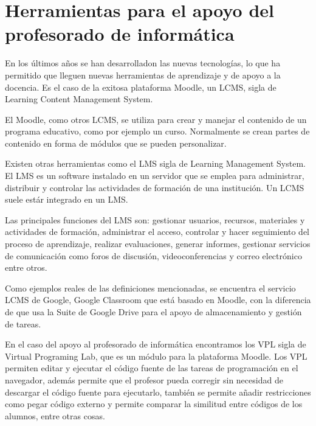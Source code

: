 
\section{Herramientas para el apoyo del profesorado de informática}
\label{1:sec:1}

En los últimos años se han desarrolladon las nuevas tecnologías, lo que ha permitido que lleguen nuevas herramientas de aprendizaje y de apoyo a la docencia. Es el caso de la exitosa plataforma Moodle, un LCMS, sigla de Learning Content Management System. 

El Moodle, como otros LCMS, se utiliza para crear y manejar el contenido de un programa educativo, como por ejemplo un curso. Normalmente se crean partes de contenido en forma de módulos que se pueden personalizar.

Existen otras herramientas como el LMS sigla de Learning Management System. El LMS es un software instalado en un servidor que se emplea para administrar, distribuir y controlar las actividades de formación de una institución. Un LCMS suele estár integrado en un LMS.

Las principales funciones del LMS son: gestionar usuarios, recursos, materiales y actividades de formación, administrar el acceso, controlar y hacer seguimiento del proceso de aprendizaje, realizar evaluaciones, generar informes, gestionar servicios de comunicación como foros de discusión, videoconferencias y correo electrónico entre otros.

Como ejemplos reales de las definiciones mencionadas, se encuentra el servicio LCMS de Google, Google Classroom que está basado en Moodle, con la diferencia de que usa la Suite de Google Drive para el apoyo de almacenamiento y gestión de tareas.

En el caso del apoyo al profesorado de informática encontramos los VPL sigla de Virtual Programing Lab, \cite{B14} que es un módulo para la plataforma Moodle. Los VPL permiten editar y ejecutar el código fuente de las tareas de programación en el navegador, además permite que el profesor pueda corregir sin necesidad de descargar el código fuente para ejecutarlo, también se permite añadir restricciones como pegar código externo y permite comparar la similitud entre códigos de los alumnos, entre otras cosas.

